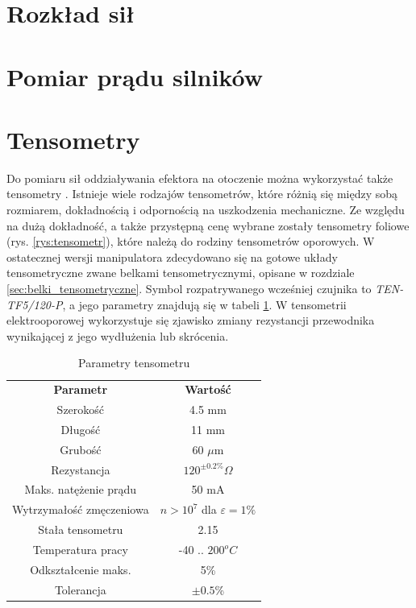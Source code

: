 \documentclass[printmode]{mgr}
\begin{document}
\section{Rozkład sił}\label{sec:rozklad_sil}

\section{Pomiar prądu silników}\label{sec:pomiar_pradu_silnikow}

\section{Tensometry}\label{sec:tensometry}
Do pomiaru sił oddziaływania efektora na otoczenie można wykorzystać także tensometry \cite{tensometry}.
Istnieje wiele rodzajów tensometrów, które różnią się między sobą rozmiarem, dokładnością i odpornością na uszkodzenia mechaniczne.
Ze względu na dużą dokładność, a także przystępną cenę wybrane zostały tensometry foliowe (rys. \ref{rys:tensometr}), 
które należą do rodziny tensometrów oporowych. W ostatecznej wersji manipulatora zdecydowano się na gotowe układy
tensometryczne zwane belkami tensometrycznymi, opisane w rozdziale \ref{sec:belki_tensometryczne}. 
Symbol rozpatrywanego wcześniej czujnika to \emph{TEN-TF5/120-P}, a jego parametry znajdują się w tabeli \ref{tab:tensometr}.
W tensometrii elektrooporowej wykorzystuje się zjawisko zmiany rezystancji przewodnika wynikającej z jego wydłużenia lub skrócenia.
\begin{table}[tp]
  \caption{Parametry tensometru}
  \label{tab:tensometr}
  \centering
  \begin{tabular}{||c|c||}
    \hline\hline
{\bf Parametr} & {\bf Wartość} \\
Szerokość & 4.5 mm \\
Długość & 11 mm \\
Grubość & 60 $\mu$m \\
Rezystancja & $120^{\pm0.2\%}\Omega$ \\
Maks. natężenie prądu & 50 mA \\
Wytrzymałość zmęczeniowa & $n>10^7$ dla $\varepsilon = 1\%$ \\
Stała tensometru & 2.15 \\
Temperatura pracy & -40 .. $200^o C$ \\
Odkształcenie maks. & 5\% \\
Tolerancja & $\pm 0.5$\% \\ 
\hline\hline
  \end{tabular}
\end{table}
\end{document}
